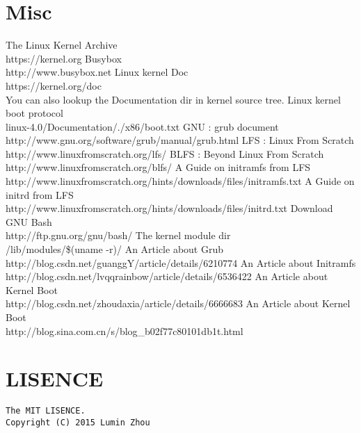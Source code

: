 \documentclass[10pt,a4paper]{article}
\begin{document}
\section{Misc}
\begin{thebibliography}{10}
	 The Linux Kernel Archive\\https://kernel.org
	 Busybox\\http://www.busybox.net
	 Linux kernel Doc\\https://kernel.org/doc\\You can also lookup the Documentation dir in kernel source tree.
	 Linux kernel boot protocol\\linux-4.0/Documentation/./x86/boot.txt
	 GNU : grub document\\http://www.gnu.org/software/grub/manual/grub.html
	 LFS : Linux From Scratch\\http://www.linuxfromscratch.org/lfs/
	 BLFS : Beyond Linux From Scratch\\http://www.linuxfromscratch.org/blfs/
	\bibitem{ } A Guide on initramfs from LFS\\http://www.linuxfromscratch.org/hints/downloads/files/initramfs.txt
	\bibitem{ } A Guide on initrd from LFS\\http://www.linuxfromscratch.org/hints/downloads/files/initrd.txt
	 Download GNU Bash\\http://ftp.gnu.org/gnu/bash/
	\bibitem{ } The kernel module dir\\/lib/modules/\$(uname -r)/
	\bibitem{ } An Article about Grub\\http://blog.csdn.net/guanggY/article/details/6210774
	\bibitem{ } An Article about Initramfs\\http://blog.csdn.net/lvqqrainbow/article/details/6536422
	\bibitem{ } An Article about Kernel Boot\\http://blog.csdn.net/zhoudaxia/article/details/6666683
	\bibitem{ } An Article about Kernel Boot\\http://blog.sina.com.cn/s/blog\_b02f77c80101db1t.html
\end{thebibliography}

\section{LISENCE}
\begin{verbatim}
The MIT LISENCE.
Copyright (C) 2015 Lumin Zhou
\end{verbatim}
\end{document}
